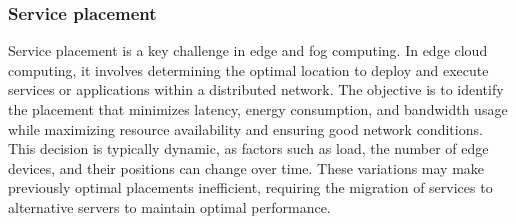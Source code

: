 \subsubsection{Service placement}
Service placement is a key challenge in edge and fog computing. In edge cloud computing, it involves determining the optimal location to deploy and execute services or applications within a distributed network. The objective is to identify the placement that minimizes latency, energy consumption, and bandwidth usage while maximizing resource availability and ensuring good network conditions. This decision is typically dynamic, as factors such as load, the number of edge devices, and their positions can change over time. These variations may make previously optimal placements inefficient, requiring the migration of services to alternative servers to maintain optimal performance.\cite{zheng_service_2024}